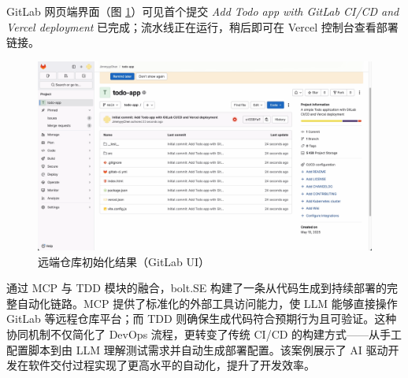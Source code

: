 GitLab 网页端界面（图 \ref{fig:gitlab_repo}）可见首个提交 \textit{Add Todo app with GitLab CI/CD and Vercel deployment} 已完成；流水线正在运行，稍后即可在 Vercel 控制台查看部署链接。

\begin{figure}[H]
  \centering
  \includegraphics[width=\textwidth]{figures/screenshots/ci-cd/gitlab_repo.png}
  \caption{远端仓库初始化结果（GitLab UI）}
  \label{fig:gitlab_repo}
\end{figure}

通过 MCP 与 TDD 模块的融合，bolt.SE 构建了一条从代码生成到持续部署的完整自动化链路。MCP 提供了标准化的外部工具访问能力，使 LLM 能够直接操作 GitLab 等远程仓库平台；而 TDD 则确保生成代码符合预期行为且可验证。这种协同机制不仅简化了 DevOps 流程，更转变了传统 CI/CD 的构建方式——从手工配置脚本到由 LLM 理解测试需求并自动生成部署配置。该案例展示了 AI 驱动开发在软件交付过程实现了更高水平的自动化，提升了开发效率。
